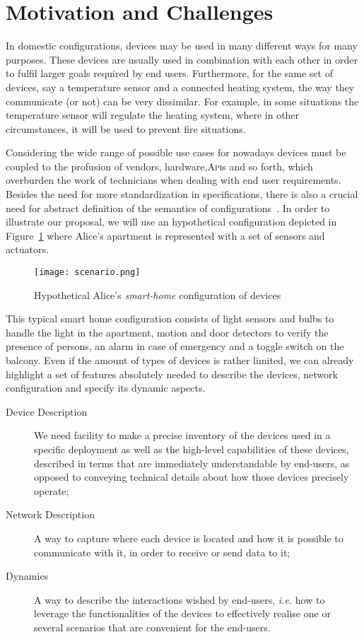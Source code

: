 \section{Motivation and Challenges}
\label{sec:Motivation}

In domestic configurations, \IOT devices may be used in many different ways for many purposes. These devices are usually used in combination with each other in order to fulfil larger goals required by end users. Furthermore, for the same set of devices, say a temperature sensor and a connected heating system, the way they communicate (or not) can be very dissimilar. For example, in some situations the temperature sensor will regulate the heating system, where in other circumstances, it will be used to prevent fire situations. 

Considering the wide range of possible use cases for nowadays devices must be coupled to the profusion of vendors, hardware,\textsc{Api}s and so forth, which overburden the work of \IOT technicians when dealing with end user requirements. Besides the need for more standardization in \IOT specifications, there is also a crucial need for abstract definition of the semantics of \IOT configurations~\cite{park-16}. In order to illustrate our proposal, we will use an hypothetical \IOT configuration depicted in Figure~\ref{fig:scenario} where Alice's apartment is represented with a set of sensors and actuators.

\begin{figure}%
	\centering  
	\texttt{[image: scenario.png]}%
	\caption{Hypothetical Alice's \textit{smart-home} configuration of \IOT devices}%
	\label{fig:scenario}%
\end{figure}

This typical smart home configuration consists of light sensors and bulbs to handle the light in the apartment, motion and door detectors to verify the presence of persons, an alarm in case of emergency and a toggle switch on the balcony. Even if the amount of types of devices is rather limited, we can already highlight a set of features absolutely needed to describe the devices, network configuration and specify its dynamic aspects.

\begin{description}
	\item[Device Description] We need facility to make a precise inventory of the devices used in a specific deployment as well as the high-level capabilities of these devices, described in terms that are immediately understandable by end-users, as opposed to conveying technical details about how those devices precisely operate;
	
	\item[Network Description] A way to capture where each device is located and how it is possible to communicate with it, in order to receive or send data to it;
	
	\item[Dynamics] A way to describe the interactions wished by end-users, \textit{i.e.} how to leverage the functionalities of the devices to effectively realise one or several scenarios that are convenient for the end-users.  
\end{description}

